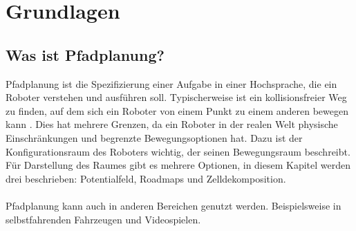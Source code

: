 \chapter{Grundlagen}

\section{Was ist Pfadplanung?}
Pfadplanung ist die Spezifizierung einer Aufgabe in einer Hochsprache, die ein Roboter verstehen und ausführen soll. Typischerweise ist ein kollisionsfreier Weg zu finden, auf dem sich ein Roboter von einem Punkt zu einem anderen bewegen kann \cite[~S. 1]{Principles:05}. Dies hat mehrere Grenzen, da ein Roboter in der realen Welt physische Einschränkungen und begrenzte Bewegungsoptionen hat. Dazu ist der Konfigurationsraum des Roboters wichtig, der seinen Bewegungsraum beschreibt. Für Darstellung des Raumes gibt es mehrere Optionen, in diesem Kapitel werden drei beschrieben: Potentialfeld, Roadmaps und Zelldekomposition.
\\\\
Pfadplanung kann auch in anderen Bereichen genutzt werden. Beispielsweise in selbstfahrenden Fahrzeugen und Videospielen. 


